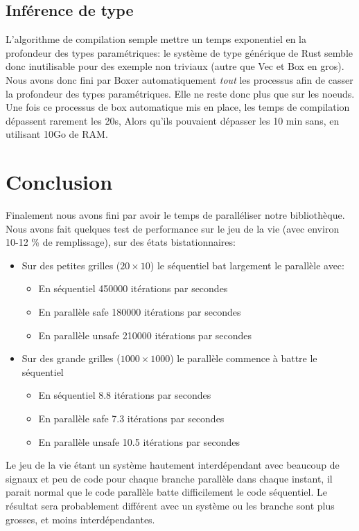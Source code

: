 \documentclass[a4paper]{article}
\renewcommand{\(}{\left(}
\renewcommand{\)}{\right)}
\begin{document}
\subsection{Inférence de type}
L'algorithme de compilation semple mettre un temps exponentiel en la profondeur
des types paramétriques: le système de type générique de Rust semble donc inutilisable
pour des exemple non triviaux (autre que Vec et Box en gros). Nous avons donc
fini par Boxer automatiquement \emph{tout} les processus afin de casser la
profondeur des types paramétriques. Elle ne reste donc plus que sur les noeuds.
Une fois ce processus de box automatique mis en place, les temps de compilation
dépassent rarement les 20s, Alors qu'ils pouvaient dépasser les 10 min sans, en
utilisant 10Go de RAM.

\section{Conclusion}
Finalement nous avons fini par avoir le temps de paralléliser notre
bibliothèque. Nous avons fait quelques test de performance sur le jeu de la vie
(avec environ 10-12 \% de remplissage), sur des états bistationnaires:

\begin{itemize}
\item Sur des petites grilles ($20 \times 10$) le séquentiel bat largement le
  parallèle avec:
  \begin{itemize}
  \item  En séquentiel 450000 itérations par secondes
  \item  En parallèle safe 180000 itérations par secondes
  \item  En parallèle unsafe 210000 itérations par secondes
  \end{itemize}
\item Sur des grande grilles ($1000 \times 1000$) le parallèle commence à battre le séquentiel
  \begin{itemize}
  \item  En séquentiel 8.8 itérations par secondes
  \item  En parallèle safe 7.3 itérations par secondes
  \item  En parallèle unsafe 10.5 itérations par secondes
  \end{itemize}
\end{itemize}

Le jeu de la vie étant un système hautement interdépendant avec beaucoup de
signaux et peu de code pour chaque branche parallèle dans chaque instant, il
parait normal que le code parallèle batte difficilement le code séquentiel. Le
résultat sera probablement différent avec un système ou les branche sont plus
grosses, et moins interdépendantes.
\end{document}
